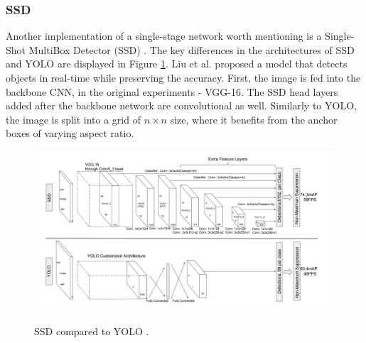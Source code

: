 


\subsubsection{SSD}
Another implementation of a single-stage network worth mentioning is a Single-Shot MultiBox Detector (SSD) \cite{Liu2015}. The key differences in the architectures of SSD and YOLO are displayed in Figure \ref{ssd}. Liu et al. proposed a model that detects objects in real-time while preserving the accuracy. First, the image is fed into the backbone CNN, in the original experiments - VGG-16. The SSD head layers added after the backbone network are convolutional as well. Similarly to YOLO, the image is split into a grid of $n\times n$ size, where it benefits from the anchor boxes of varying aspect ratio. 


\begin{figure}[htb]
	\begin{center}
		\includegraphics[width=14cm]{./ssd_yolo.png}
	\end{center}
	\caption{SSD compared to YOLO \cite{Liu2015}.}
	\begin{center}
		\label{ssd}
	\end{center}
\end{figure}

